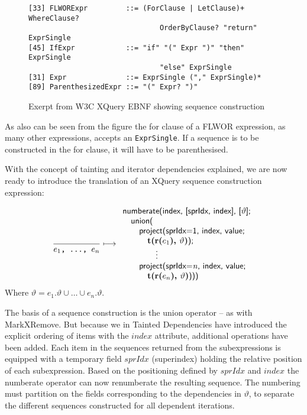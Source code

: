 \begin{figure}[h]
\begin{Verbatim}
[33] FLWORExpr         ::= (ForClause | LetClause)+ WhereClause? 
                               OrderByClause? "return" ExprSingle
[45] IfExpr            ::= "if" "(" Expr ")" "then" ExprSingle 
                               "else" ExprSingle
[31] Expr              ::= ExprSingle ("," ExprSingle)*
[89] ParenthesizedExpr ::= "(" Expr? ")"
\end{Verbatim}
\caption[Exerpt from W3C XQuery EBNF]{Exerpt from W3C XQuery EBNF showing sequence construction}
\label{fig:trans:TD:seqEBNF}
\end{figure}

As also can be seen from the figure the for clause of a FLWOR expression, as many other expressions, accepts an
\texttt{ExprSingle}. If a sequence is to be constructed in the for clause, it will have to be parenthesised. 

With the concept of tainting and iterator dependencies explained, we are now ready to introduce the translation of
an XQuery sequence construction expression:

\begin{equation}
\frac{}{e_{1}\mbox{\texttt{, \ldots, }}e_{n}}\longmapsto
\begin{array}{l}
\mbox{\textsf{numberate(index, [sprIdx, index], [}}\vartheta\mbox{\textsf{];}} \\ \quad
\mbox{\textsf{union(}} \\ \quad \quad
\mbox{\textsf{project(sprIdx=1, index, value; }} \\ \quad \quad \quad
\mbox{\textbf{t(r(}}e_{1}\mbox{\textbf{), }}\vartheta\mbox{\textbf{)}\textsf{);}} \\ \quad \quad
\qquad\vdots\\ \quad \quad
\mbox{\textsf{project(sprIdx=}\textit{n}\textsf{, index, value; }} \\ \quad \quad \quad
\mbox{\textbf{t(r(}}e_{n}\mbox{\textbf{), }}\vartheta\mbox{\textbf{)}\textsf{)))}}
\end{array}
\label{rule:trans:TD:seqConstr}
\end{equation}
Where $\vartheta=e_{1}.\vartheta \cup \ldots \cup e_{n}.\vartheta$.

The basis of a sequence construction is the \textsf{union} operator -- as with MarkXRemove. But because we in
Tainted Dependencies have introduced the explicit ordering of items with the $index$ attribute, additional
operations have been added. Each item in the sequences returned from the subexpressions is equipped with a
temporary field $sprIdx$ (superindex) holding the relative position of each subexpression. Based on the
positioning defined by $sprIdx$ and $index$ the \textsf{numberate} operator can now renumberate the resulting
sequence. The numbering must partition on the fields corresponding to the dependencies in $\vartheta$, to separate
the different sequences constructed for all dependent iterations.

